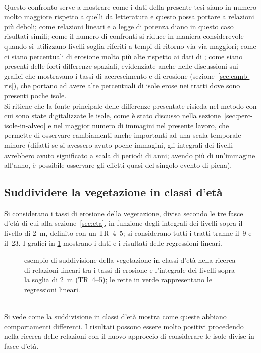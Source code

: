 %
\\
Questo confronto serve a mostrare come i dati della presente tesi siano in numero molto maggiore rispetto a quelli da letteratura e questo possa portare a relazioni più deboli;
come relazioni lineari e a legge di potenza diano in questo caso risultati simili;
come il numero di confronti si riduce in maniera considerevole quando si utilizzano livelli soglia riferiti a tempi di ritorno via via maggiori;
come ci siano percentuali di erosione molto più alte rispetto ai dati di ;
come siano presenti delle forti differenze spaziali, evidenziate anche nelle discussioni sui grafici che mostravano i tassi di accrescimento e di erosione (sezione~\ref{sec:camb-ris}), che portano ad avere alte percentuali di isole erose nei tratti dove sono presenti poche isole.
\\
Si ritiene che la fonte principale delle differenze presentate risieda nel metodo con cui sono state digitalizzate le isole, come è stato discusso nella sezione~\ref{sec:perc-isole-in-alveo} e nel maggior numero di immagini nel presente lavoro, che permette di osservare cambiamenti anche importanti ad una scala temporale minore (difatti se si avessero avuto poche immagini, gli integrali dei livelli avrebbero avuto significato a scala di periodi di anni; avendo più di un'immagine all'anno, è possibile osservare gli effetti quasi del singolo evento di piena).





\subsection{Suddividere la vegetazione in classi d'età}
Si considerano i tassi di erosione della vegetazione, divisa secondo le tre fasce d'età di cui alla sezione~\ref{sec:eta}, in funzione degli integrali dei livelli sopra il livello di \SI{2}{\m}, definito con un TR~\SIrange[range-phrase = {-}, range-units = single]{4}{5}{\mesi}; si considerano tutti i tratti tranne il~9 e il~23.
I grafici in \cref{graph:iote-classi-eta-lin} mostrano i dati e i risultati delle regressioni lineari.
%
\begin{figure}
	\centering
	
	\caption[suddivisione in classi d'età nella ricerca di relazioni tra erosione e piene]{esempio di suddivisione della vegetazione in classi d'età nella ricerca di relazioni lineari tra i tassi di erosione e l'integrale dei livelli sopra la soglia di \SI{2}{\m} (TR~\SIrange[range-phrase = {-}, range-units = single]{4}{5}{\mesi}); le rette in verde rappresentano le regressioni lineari.}
	\label{graph:iote-classi-eta-lin}
\end{figure}
%
\\
Si vede come la suddivisione in classi d'età mostra come queste abbiano comportamenti differenti.
I risultati possono essere molto positivi procedendo nella ricerca delle relazioni con il nuovo approccio di considerare le isole divise in fasce d'età.




